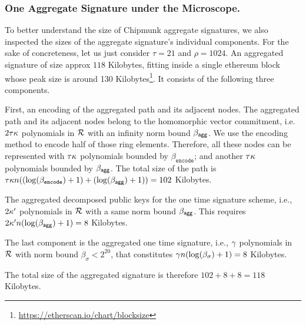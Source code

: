 \subsubsection{One Aggregate Signature under the Microscope.}


To better understand the size of Chipmunk aggregate signatures, we also inspected the sizes of the aggregate signature's individual components.
For the sake of concreteness, let us just consider $\tau=21$ and $\rho=1024$.
An aggregated signature of size approx $118$ Kilobytes,
fitting inside a single ethereum block whose peak size is around 130 Kilobytes\footnote{\url{https://etherscan.io/chart/blocksize}}.
It consists of the following three components.

First, an encoding of the aggregated path and its adjacent nodes. %
The aggregated path and its adjacent nodes belong to the homomorphic vector commitment, i.e. $2\tau\kappa$ polynomials in $\mathcal{R}$ with an infinity norm bound $\beta_{\mathsf{agg}}$.
We use the encoding method to encode half of those ring elements. Therefore, all these nodes can be represented with $\tau\kappa$ polynomials bounded by $\beta_{\texttt{encode}}$; 
and another $\tau\kappa$ polynomials bounded by $\beta_{\mathsf{agg}}$. The total size of the path is $\tau\kappa n((\log(\beta_{\texttt{encode}})+1) + (\log(\beta_{\mathsf{agg}})+1)) = 102$ Kilobytes.

The aggregated decomposed public keys for the one time signature scheme, i.e., $2\kappa'$ polynomials in $\mathcal{R}$ with a same norm bound $\beta_{\mathsf{agg}}$. This requires $2\kappa'n(\log(\beta_{\mathsf{agg}})+1)=8$ Kilobytes.

The last component is the aggregated one time signature, i.e., $\gamma$ polynomials in $\mathcal{R}$ with norm bound $\beta_\sigma < 2^{20}$, that constitutes $\gamma n (\log(\beta_\sigma)+1)=8$ Kilobytes. %

The total size of the aggregated signature is therefore $102 + 8 + 8 = 118$ Kilobytes.
